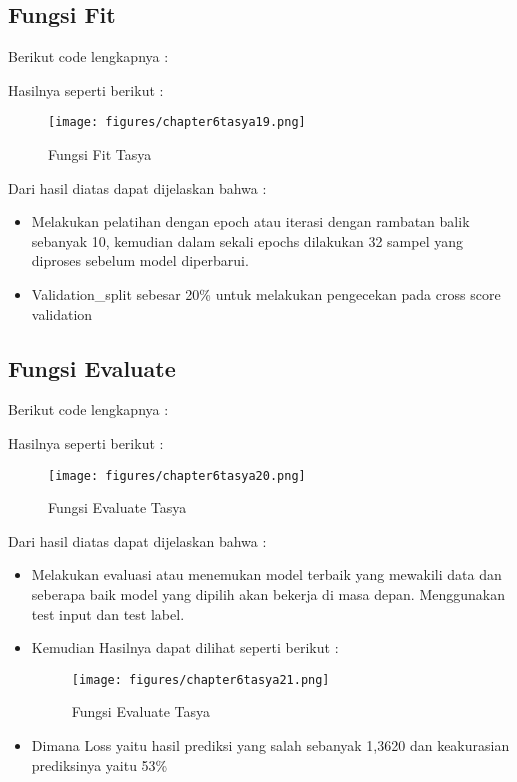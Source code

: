 \subsection{Fungsi Fit}
Berikut code lengkapnya :

Hasilnya seperti berikut :
\begin{figure}[ht]
\centering
\texttt{[image: figures/chapter6tasya19.png]}
\caption{Fungsi Fit Tasya}
\label{Praktek}
\end{figure}
Dari hasil diatas dapat dijelaskan bahwa :
\begin{itemize}
\item Melakukan pelatihan dengan epoch atau iterasi dengan rambatan balik sebanyak 10, kemudian dalam sekali epochs dilakukan 32  sampel yang diproses sebelum model diperbarui.
\item Validation\_split sebesar 20\% untuk melakukan pengecekan pada cross score validation
\end{itemize}

\subsection{Fungsi Evaluate}
Berikut code lengkapnya : 

Hasilnya seperti berikut :
\begin{figure}[ht]
\centering
\texttt{[image: figures/chapter6tasya20.png]}
\caption{Fungsi Evaluate Tasya}
\label{Praktek}
\end{figure}
Dari hasil diatas dapat dijelaskan bahwa :
\begin{itemize}
\item Melakukan evaluasi atau  menemukan model terbaik yang mewakili data dan seberapa baik model yang dipilih akan bekerja di masa depan. Menggunakan test input dan test label.
\item Kemudian Hasilnya dapat dilihat seperti berikut :
\begin{figure}[ht]
\centering
\texttt{[image: figures/chapter6tasya21.png]}
\caption{Fungsi Evaluate Tasya}
\label{Praktek}
\end{figure}
\item Dimana Loss yaitu hasil prediksi yang salah sebanyak 1,3620 dan keakurasian prediksinya yaitu 53\%
\end{itemize}

